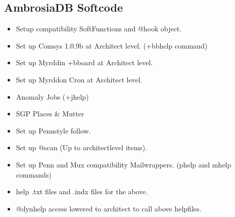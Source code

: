 \documentclass[letterpaper,10pt,english]{sphinxmanual}
\begin{document}
\subsection{AmbrosiaDB Softcode}
\label{\detokenize{ambrosiadb:ambrosiadb-softcode}}\begin{itemize}
\item {} 
\sphinxAtStartPar
Set\sphinxhyphen{}up compatibility SoftFunctions and @hook object.

\item {} 
\sphinxAtStartPar
Set up Comsys 1.0.9b at Architect level. (+bbhelp command)

\item {} 
\sphinxAtStartPar
Set up Myrddin +bboard at Architect level.

\item {} 
\sphinxAtStartPar
Set up Myrddon Cron at Architect level.

\item {} 
\sphinxAtStartPar
Anomaly Jobs (+jhelp)

\item {} 
\sphinxAtStartPar
SGP Places \& Mutter

\item {} 
\sphinxAtStartPar
Set up Penn\sphinxhyphen{}style follow.

\item {} 
\sphinxAtStartPar
Set up @scan (Up to architect\sphinxhyphen{}level items).

\item {} 
\sphinxAtStartPar
Set up Penn\sphinxhyphen{} and Mux compatibility Mailwrappers. (phelp and mhelp commands)

\item {} 
\sphinxAtStartPar
help .txt files and .indx files for the above.

\item {} 
\sphinxAtStartPar
@dynhelp access lowered to architect to call above helpfiles.

\end{itemize}
\end{document}
